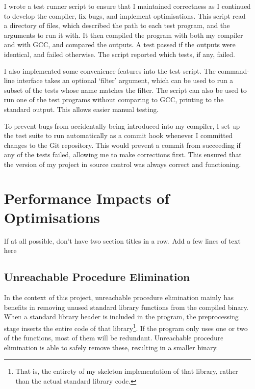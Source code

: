 \documentclass[00-main.tex]{subfiles}
\begin{document}
I wrote a test runner script to ensure that I maintained correctness as I continued to develop the compiler, fix bugs, and implement optimisations.
This script read a directory of  files, which described the path to each test program, and the arguments to run it with.
It then compiled the program with both my compiler and with GCC, and compared the outputs.
A test passed if the outputs were identical, and failed otherwise.
The script reported which tests, if any, failed.

I also implemented some convenience features into the test script.
The command-line interface takes an optional `filter' argument, which can be used to run a subset of the tests whose name matches the filter.
The script can also be used to run one of the test programs without comparing to GCC, printing to the standard output. This allows easier manual testing.

To prevent bugs from accidentally being introduced into my compiler, I set up the test suite to run automatically as a commit hook whenever I committed changes to the Git repository.
This would prevent a commit from succeeding if any of the tests failed, allowing me to make corrections first.
This ensured that the version of my project in source control was always correct and functioning.




\section{Performance Impacts of Optimisations}

\begin{Comment}
If at all possible, don't have two section titles in a row. Add a few lines of text here
\end{Comment}

\subsection{Unreachable Procedure Elimination}

In the context of this project, unreachable procedure elimination mainly has benefits in removing unused standard library functions from the compiled binary.
When a standard library header is included in the program, the preprocessing stage inserts the entire code of that library\footnote{That is, the entirety of my skeleton implementation of that library, rather than the actual standard library code.}.
If the program only uses one or two of the functions, most of them will be redundant.
Unreachable procedure elimination is able to safely remove these, resulting in a smaller binary.
\end{document}
